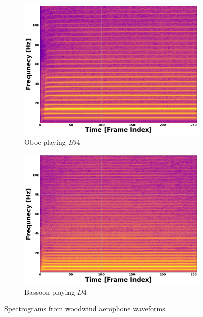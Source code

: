 \documentclass[12pt,letterpaper]{article}
\begin{document}
\begin{figure}[H]
	\begin{subfigure}{0.45\textwidth}
	\centering
	\includegraphics[scale=0.2]{../FiguresSpectrogram/Oboe-Bb4}
	\caption{Oboe playing $B\flat 4$}
	\end{subfigure}
	\hfill
	\begin{subfigure}{0.45\textwidth}
	\centering
	\includegraphics[scale=0.2]{../FiguresSpectrogram/Bassoon-D4}
	\caption{Bassoon playing $D4$}
	\end{subfigure}
\caption{Spectrograms from woodwind aerophone waveforms}	
\label{fig-PropertiesAerophonesWind}
\end{figure}
\end{document}
